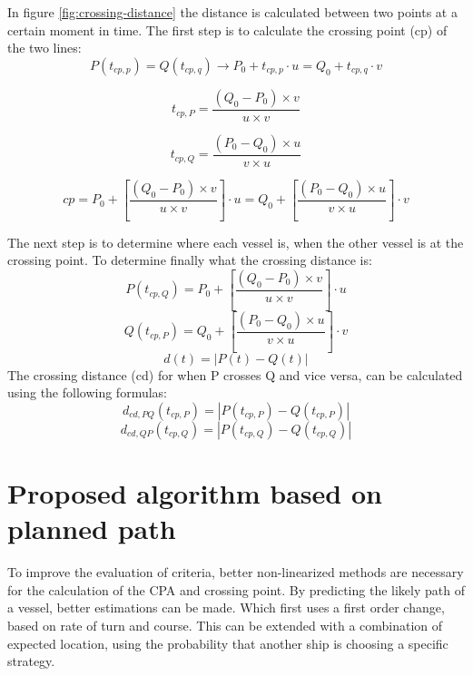 In figure \ref{fig:crossing-distance} the distance is calculated between two points at a certain moment in time. The first step is to calculate the crossing point (cp) of the two lines:
\begin{equation}
	P(t_{cp,p}) = Q(t_{cp,q}) \rightarrow P_0 + t_{cp,p} \cdot u = Q_0 + t_{cp,q} \cdot v
\end{equation}

\begin{equation}
	t_{cp,P} = \frac{(Q_0 - P_0) \times v}{u \times v}
\end{equation}

\begin{equation}
	t_{cp,Q} = \frac{(P_0 - Q_0) \times u}{v \times u}
\end{equation}


\begin{equation}
	cp = P_0 + \left[ \frac{(Q_0 - P_0) \times v}{u \times v} \right] \cdot u =  Q_0 + \left[ \frac{(P_0 - Q_0) \times u}{v \times u} \right] \cdot v
\end{equation}

The next step is to determine where each vessel is, when the other vessel is at the crossing point. To determine finally what the crossing distance is:
\begin{equation}
	P(t_{cp,Q}) = P_0 + \left[ \frac{(Q_0 - P_0) \times v}{u \times v} \right] \cdot u
\end{equation}
\begin{equation}
	Q(t_{cp,P}) = Q_0 + \left[ \frac{(P_0 - Q_0) \times u}{v \times u} \right] \cdot v
\end{equation}
\begin{equation}
	d(t) = |P(t) - Q(t)|
\end{equation}
The crossing distance (cd) for when P crosses Q and vice versa, can be calculated using the following formulas:
\begin{equation}
	d_{cd,PQ}(t_{cp,P}) = |P(t_{cp,P}) - Q(t_{cp,P})|
\end{equation}
\begin{equation}
	d_{cd,QP}(t_{cp,Q}) = |P(t_{cp,Q}) - Q(t_{cp,Q})|
\end{equation}

\section{Proposed algorithm based on planned path}
To improve the evaluation of criteria, better non-linearized methods are necessary for the calculation of the \ac{CPA} and crossing point. By predicting the likely path of a vessel, better estimations can be made. Which first uses a first order change, based on rate of turn and course. This can be extended with a combination of expected location, using the probability that another ship is choosing a specific strategy.

